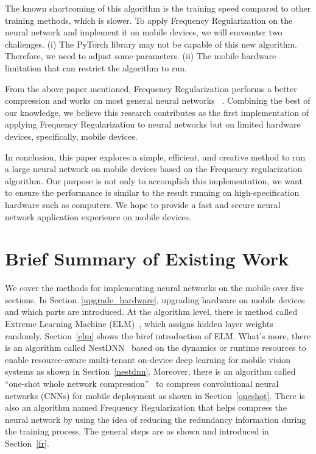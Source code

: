 \documentclass{article}
\begin{document}
The known shortcoming of this algorithm is the training speed compared to other training methods, which is slower. To apply Frequency Regularization on the neural network and implement it on mobile devices, we will encounter two challenges. (i) The PyTorch library may not be capable of this new algorithm. Therefore, we need to adjust some parameters. (ii) The mobile hardware limitation that can restrict the algorithm to run. 

From the above paper mentioned, Frequency Regularization performs a better compression and works on most general neural networks ~\cite{zhao2023frequency}. Combining the best of our knowledge, we believe this research contributes as the first implementation of applying Frequency Regularization to neural networks but on limited hardware devices, specifically, mobile devices.



In conclusion, this paper explores a simple, efficient, and creative method to run a large neural network on mobile devices based on the Frequency regularization algorithm. Our purpose is not only to accomplish this implementation, we want to ensure the performance is similar to the result running on high-specification hardware such as computers. We hope to provide a fast and secure neural network application experience on mobile devices.


\section{Brief Summary of Existing Work}

We cover the methods for implementing neural networks on the mobile over five sections. In Section~\ref{upgrade_hardware}, upgrading hardware on mobile devices and which parts are introduced. At the algorithm level, there is method called Extreme Learning Machine (ELM)~\cite{akusok2019metal}, which assigns hidden layer weights randomly. Section~\ref{elm} shows the biref introduction of ELM. What's more, there is an algorithm called NestDNN~\cite{fang2018nestdnn} based on the dynamics or runtime resources to enable resource-aware multi-tenant on-device deep learning for mobile vision systems as shown in Section~\ref{nestdnn}. Moreover, there is an algorithm called “one-shot whole network compression”~\cite{kim2016compression} to compress convolutional neural networks (CNNs) for mobile deployment as shown in Section~\ref{oneshot}. There is also an algorithm named Frequency Regularization that helps compress the neural network by using the idea of reducing the redundancy information during the training process. The general steps are as shown and introduced in Section~\ref{fr}.
\end{document}
